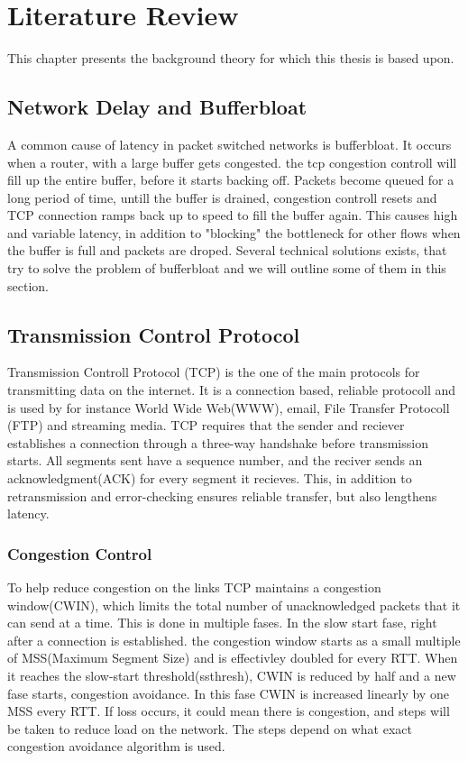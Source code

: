 \chapter{Literature Review}

This chapter presents the background theory for which this thesis is based upon.


\section{Network Delay and Bufferbloat}
A common cause of latency in packet switched networks is bufferbloat. It occurs when a router, with a 
large buffer gets congested. the tcp congestion controll will fill up the entire buffer, before 
it starts backing off. Packets become queued for a long period of time, untill the buffer is drained,
congestion controll resets and TCP connection ramps back up to speed to fill the buffer again.
This causes high and variable latency, in addition to "blocking" the bottleneck for other flows
when the buffer is full and packets are droped. 
Several technical solutions exists, that try to solve the problem of bufferbloat and we will outline 
some of them  in this section.
\section{Transmission Control Protocol}
Transmission Controll Protocol (TCP) is the one of the main protocols for transmitting data on the internet.
It is a connection based, reliable protocoll and is used by for instance World Wide Web(WWW), email, 
File Transfer Protocoll (FTP) and streaming media. TCP requires that the sender and reciever establishes a connection 
through a three-way handshake before transmission starts. All segments sent have a sequence number, and the reciver sends 
an acknowledgment(ACK) for every segment it recieves. This, in addition to retransmission and error-checking ensures
reliable transfer, but also lengthens latency.

\subsection{Congestion Control}
To help reduce congestion on the links TCP maintains a congestion window(CWIN), which limits the total number of 
unacknowledged packets that it can send at a time. This is  done in multiple fases.
In the slow start fase,  right after a connection is established. the congestion window starts as a small multiple 
of MSS(Maximum Segment Size) and is effectivley doubled for every RTT. When it reaches the slow-start threshold(ssthresh),
CWIN is reduced by half and a new fase starts, congestion avoidance. In this fase CWIN is increased linearly by one MSS 
every RTT. If loss occurs, it could mean there is congestion, and steps will be taken to reduce load on the
network. The steps depend on what exact congestion avoidance algorithm is used.



